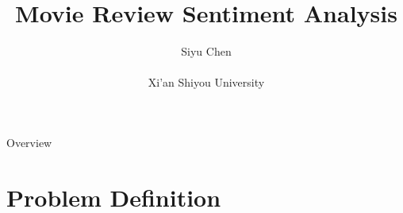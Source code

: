 \documentclass[
 size=14pt,
 paper=smartboard,  %
 mode=present, 		%
 display=slides, 	%
 style=tuliplab,  	%
 pauseslide,
 fleqn,leqno]{powerdot}
\title{Movie Review Sentiment Analysis}
\author{
Siyu Chen
\\
\\Xi'an Shiyou University

}
\date{\gitCommitterDate}
\begin{document}
\maketitle



\begin{slide}[toc=,bm=]{Overview}
\tableofcontents[content=currentsection,type=1]
\end{slide}


\section{Problem Definition}
\end{document}
